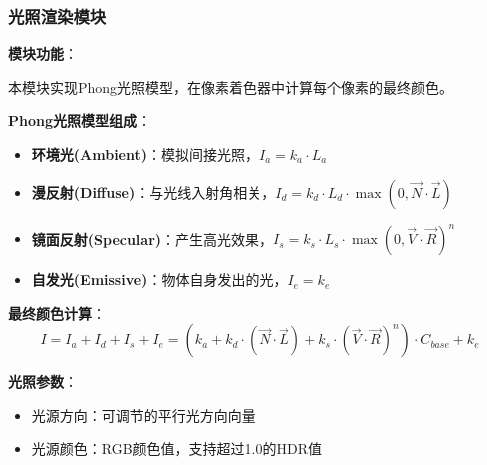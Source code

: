 \documentclass[12pt,a4paper]{article}
\begin{document}
\begin{tcolorbox}
\subsubsection{光照渲染模块}

\textbf{模块功能}：

本模块实现Phong光照模型，在像素着色器中计算每个像素的最终颜色。

\textbf{Phong光照模型组成}：
\begin{itemize}
    \item \textbf{环境光(Ambient)}：模拟间接光照，$I_a = k_a \cdot L_a$
    \item \textbf{漫反射(Diffuse)}：与光线入射角相关，$I_d = k_d \cdot L_d \cdot \max(0, \vec{N} \cdot \vec{L})$
    \item \textbf{镜面反射(Specular)}：产生高光效果，$I_s = k_s \cdot L_s \cdot \max(0, \vec{V} \cdot \vec{R})^n$
    \item \textbf{自发光(Emissive)}：物体自身发出的光，$I_e = k_e$
\end{itemize}

\textbf{最终颜色计算}：
$$I = I_a + I_d + I_s + I_e = (k_a + k_d \cdot (\vec{N} \cdot \vec{L}) + k_s \cdot (\vec{V} \cdot \vec{R})^n) \cdot C_{base} + k_e$$

\textbf{光照参数}：
\begin{itemize}
    \item 光源方向：可调节的平行光方向向量
    \item 光源颜色：RGB颜色值，支持超过1.0的HDR值
\end{itemize}
\end{tcolorbox}
\end{document}
